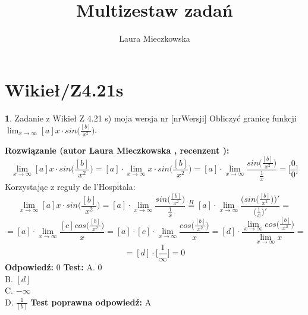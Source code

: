 \documentclass[12pt, a4paper]{article}
\title{Multizestaw zadań}
\author{Laura Mieczkowska}
\date{}
\theoremstyle{definition} %
\newtheorem{zad}{}
\newcommand{\kategoria}[1]{\section{#1}} %
\newcommand{\zadStart}[1]{\begin{zad}#1\newline} %
\newcommand{\zadStop}{\end{zad}}   %
\newcommand{\rozwStart}[2]{\noindent \textbf{Rozwiązanie (autor #1 , recenzent #2): }\newline} %
\newcommand{\odpStart}{\noindent \textbf{Odpowiedź:}\newline}    %
\newcommand{\odpStop}{\newline}                                             %
\newcommand{\testStart}{\noindent \textbf{Test:}\newline} %
\newcommand{\testStop}{\newline} %
\newcommand{\kluczStart}{\noindent \textbf{Test poprawna odpowiedź:}\newline} %
\newcommand{\kluczStop}{\newline} %
\begin{document}
\maketitle


\kategoria{Wikieł/Z4.21s}
\zadStart{Zadanie z Wikieł Z 4.21 s) moja wersja nr [nrWersji]}
Obliczyć granicę funkcji $\lim_{x \to \infty} [a]x\cdot sin\big(\frac{[b]}{x^2}\big)$.
\zadStop
\rozwStart{Laura Mieczkowska}{}
$$\lim_{x \to \infty} [a]x\cdot sin\bigg(\frac{[b]}{x^2}\bigg)=[a]\cdot \lim_{x \to \infty}x\cdot sin\bigg(\frac{[b]}{x^2}\bigg)=[a]\cdot \lim_{x \to \infty}\frac{sin\big(\frac{[b]}{x^2}\big)}{\frac{1}{x}}=\bigg[\frac{0}{0}\bigg]$$
Korzystając z reguły de l'Hospitala:
$$\lim_{x \to \infty} [a]x\cdot sin\bigg(\frac{[b]}{x^2}\bigg)=[a]\cdot \lim_{x \to \infty}\frac{sin\big(\frac{[b]}{x^2}\big)}{\frac{1}{x}}\stackrel{H}{=}
[a]\cdot \lim_{x \to \infty}\frac{\big(sin\big(\frac{[b]}{x^2}\big)\big)'}{\big(\frac{1}{x}\big)'}=$$
$$=[a]\cdot \lim_{x \to \infty}\frac{[c]cos\big(\frac{[b]}{x^2}\big)}{x}=
[a]\cdot [c]\cdot \lim_{x\to\infty}\frac{cos\big(\frac{[b]}{x^2}\big)}{x}=
[d]\cdot\frac{\lim_{x\to\infty}cos\big(\frac{[b]}{x^2}\big)}{\lim_{x\to\infty} x}=$$
$$=[d]\cdot\bigg[\frac{1}{\infty}\bigg]=0$$
\odpStart
$0$
\odpStop
\testStart
A. $0$ \\
B. $[d]$ \\
C. $-\infty$ \\
D. $\frac{1}{[b]}$ 
\testStop
\kluczStart
A
\kluczStop
\end{document}
